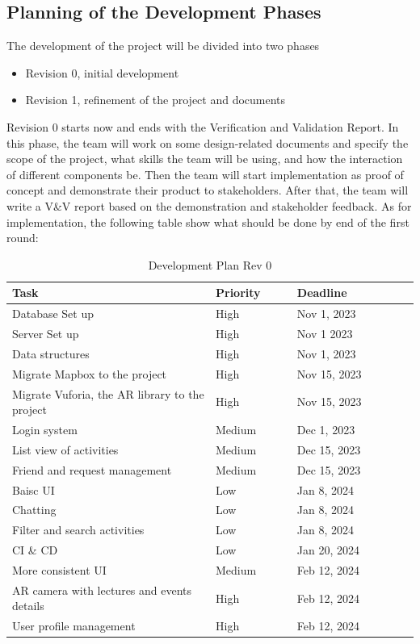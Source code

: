 \documentclass[12pt]{article}
\begin{document}
\subsection{Planning of the Development Phases}
The development of the project will be divided into two phases
\begin{itemize}
    \item Revision 0, initial development
    \item Revision 1, refinement of the project and documents
\end{itemize}
Revision 0 starts now and ends with the Verification and Validation Report. In this phase, the team will work on some design-related documents and specify the scope of the project, what skills the team will be using, and how the interaction of different components be. Then the team will start implementation as proof of concept and demonstrate their product to stakeholders. After that, the team will write a V\&V report based on the demonstration and stakeholder feedback.  As for implementation, the following table show what should be done by end of the first round:\\
\begin{table}[H]
    \centering
    \begin{tabular}{|p{0.5\linewidth} | p{0.2\linewidth}| p{0.3\linewidth} |}
    \hline
    \textbf{Task} & \textbf{Priority} & \textbf{Deadline}\\
    \hline
    Database Set up & High & Nov 1, 2023 \\
    \hline
    Server Set up & High & Nov 1 2023 \\
    \hline
    Data structures & High & Nov 1, 2023 \\
    \hline
    Migrate Mapbox to the project & High & Nov 15, 2023 \\
    \hline
    Migrate Vuforia, the AR library to the project & High & Nov 15, 2023 \\
    \hline
    Login system & Medium & Dec 1, 2023 \\
    \hline
    List view of activities & Medium & Dec 15, 2023 \\
    \hline
    Friend and request management & Medium & Dec 15, 2023 \\
    \hline
    Baisc UI & Low & Jan 8, 2024 \\
    \hline
    Chatting & Low & Jan 8, 2024 \\
    \hline
    Filter and search activities & Low & Jan 8, 2024 \\
    \hline
	CI \& CD & Low & Jan 20, 2024\\
	\hline
	More consistent UI & Medium & Feb 12, 2024\\
	\hline
	AR camera with lectures and events details & High & Feb 12, 2024\\
	\hline
	User profile management & High & Feb 12, 2024\\
    \hline
    \end{tabular}
    \caption{Development Plan Rev 0}
    \label{DevelopmentPlan0}
\end{table}
\end{document}
